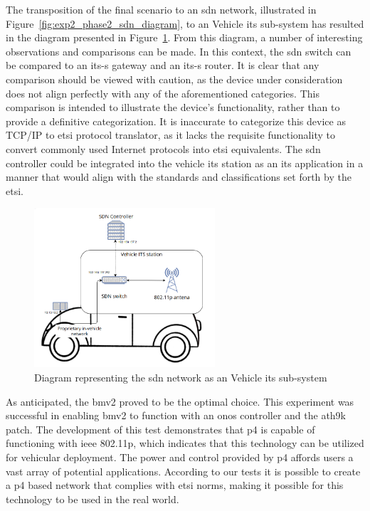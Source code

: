 The transposition of the final scenario to an \gls{sdn} network, illustrated in Figure~\ref{fig:exp2_phase2_sdn_diagram}, to an Vehicle \gls{its} sub-system has resulted in the diagram presented in Figure~\ref{fig:exp2_vehicle_subsystem}. From this diagram, a number of interesting observations and comparisons can be made. 
In this context, the \gls{sdn} switch can be compared to an \gls{its-s} gateway and an \gls{its-s} router. It is clear that any comparison should be viewed with caution, as the device under consideration does not align perfectly with any of the aforementioned categories. This comparison is intended to illustrate the device's functionality, rather than to provide a definitive categorization. It is inaccurate to categorize this device as TCP/IP to \gls{etsi} protocol translator, as it lacks the requisite functionality to convert commonly used Internet protocols into \gls{etsi} equivalents.
The \gls{sdn} controller could be integrated into the vehicle \gls{its} station as an \gls{its} application in a manner that would align with the standards and classifications set forth by the \gls{etsi}.

\begin{figure}
	\centering
	\includegraphics[width=0.6\textwidth]{Chapters/Figures/tests/bmv2_phase_2/its_vehicle_diagram.PNG}
	\caption{Diagram representing the \gls{sdn} network as an Vehicle \gls{its} sub-system}
	\label{fig:exp2_vehicle_subsystem}
\end{figure}

As anticipated, the \gls{bmv2} proved to be the optimal choice. This experiment was successful in enabling \gls{bmv2} to function with an \gls{onos} controller and the ath9k patch. The development of this test demonstrates that \gls{p4} is capable of functioning with \gls{ieee} 802.11p, which indicates that this technology can be utilized for vehicular deployment. The power and control provided by \gls{p4} affords users a vast array of potential applications. According to our tests it is possible to create a \gls{p4} based network that complies with \gls{etsi} norms, making it possible for this technology to be used in the real world.

